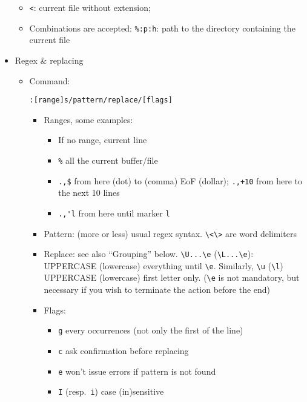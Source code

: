 \documentclass[a4paper,12pt,%
              final%
              ]{article}
\begin{document}
\begin{itemize}
\begin{itemize}
      \item \verb|<|: current file without extension;
      \item Combinations are accepted: \verb|%:p:h|: path to the directory containing the current file
    \end{itemize}
  \item Regex \& replacing
    \begin{itemize}
      \item Command:
\begin{verbatim}
:[range]s/pattern/replace/[flags]
\end{verbatim}
        \begin{itemize}
          \item Ranges, some examples:
            \begin{itemize}
              \item If no range, current line
              \item \verb|%| all the current buffer/file
              \item \verb|.,$| from here (dot) to (comma) EoF (dollar); \verb|.,+10|
                from here to the next 10 lines
              \item \verb|.,'l| from here until marker \texttt{l}
            \end{itemize}
          \item Pattern: (more or less) usual regex syntax. \verb|\<\>| are word
            delimiters
          \item Replace: see also ``Grouping'' below. \verb|\U...\e|
            (\verb|\L...\e|): UPPERCASE (lowercase) everything until \verb|\e|.
            Similarly, \verb|\u| (\verb|\l|) UPPERCASE (lowercase) first letter only.
            (\verb|\e| is not mandatory, but necessary if you wish to terminate the
            action before the end)
          \item Flags:
            \begin{itemize}
              \item \texttt{g} every occurrences (not only the first of the line)
              \item \texttt{c} ask confirmation before replacing
              \item \texttt{e} won't issue errors if pattern is not found
              \item \texttt{I} (resp.\ \texttt{i}) case (in)sensitive
            \end{itemize}
        \end{itemize}

\end{itemize}
\end{itemize}
\end{document}
